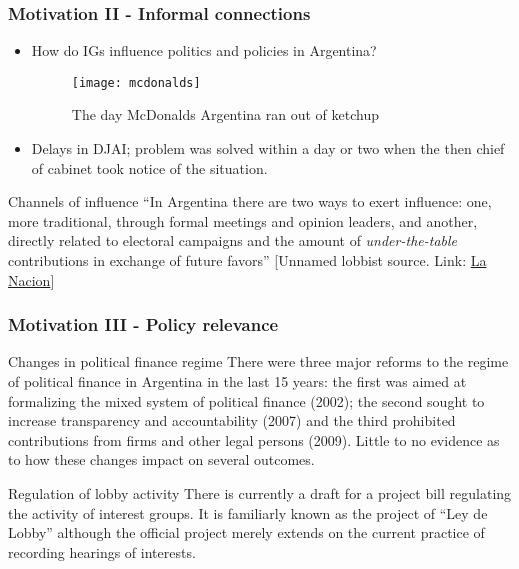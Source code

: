 \documentclass[handout,final,xcolor=dvipsnames]{beamer}
\begin{document}
\begin{frame}\frametitle{Motivation II - Informal connections}
  \begin{itemize}\itemsep 10pt
  \item How do IGs influence politics and policies
    in Argentina? 

   \begin{figure}[ht]
\centering
    \texttt{[image: mcdonalds]}
  \caption{\small The day McDonalds Argentina ran out of ketchup}  \label{figure1}
\vspace{ -5 mm}
\end{figure}\vspace{-0.25cm}
\item Delays in DJAI; problem was solved within a day or two when the then chief of
  cabinet took notice of the situation.
    \end{itemize} \vspace{-0.25cm}
  \begin{block}{Channels of influence}
  ``In Argentina there are two ways to exert influence: one, more
  traditional, through formal meetings and opinion leaders, and
  another, directly related to electoral campaigns and the amount of
 \textit{under-the-table} contributions in exchange of future favors''
 [Unnamed lobbist source. Link:
 \href{https://www.lanacion.com.ar/1758062-lobby-empresario-el-poder-detras-del-poder}{La
   Nacion}]
  \end{block}
  \end{frame}



\begin{frame}\frametitle{Motivation III - Policy relevance}
  \begin{block}{Changes in political finance regime}
There were three major reforms to the regime of political finance in
Argentina in the last 15 years: the first was aimed at formalizing the
mixed system of political finance (2002); the second sought to
increase transparency and accountability (2007) and the third
prohibited contributions from firms and other legal persons (2009). Little to
no evidence as to how these changes impact on several outcomes. 
  \end{block}
  \begin{block}{Regulation of lobby activity}
There is currently a draft for a project bill regulating the activity
of interest groups. It is familiarly known as the project of ``Ley de
Lobby'' although the official project merely extends on the current
practice of recording hearings of interests. 
    \end{block}
\end{frame}
\end{document}
